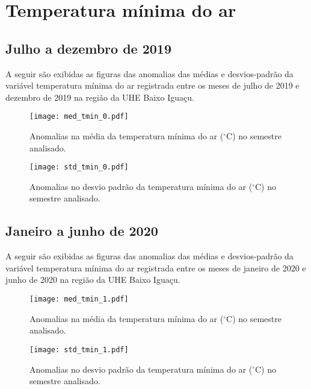 \documentclass[a4paper,12pt]{article}
\begin{document}
        \newpage

        \section{Temperatura mínima do ar }
        \subsection{Julho a dezembro de 2019}
        \hspace{0.5cm} A seguir são exibidas as figuras das anomalias das médias e desvios-padrão da variável temperatura mínima do ar
        registrada entre os meses de julho de 2019 e dezembro de 2019 na região da UHE Baixo Iguaçu.

        \begin{figure}[!htb]
        \centering
        \texttt{[image: med\_tmin\_0.pdf]}
        \caption{Anomalias na média da temperatura mínima do ar ($^\circ$C) no semestre analisado.}
        \label{fig:figmed_tmin_0}
        \end{figure}

        \begin{figure}[!htb]
        \centering
        \texttt{[image: std\_tmin\_0.pdf]}
        \caption{Anomalias no desvio padrão da temperatura mínima do ar ($^\circ$C) no semestre analisado.}
        \label{fig:figstd_tmin_0}
        \end{figure}

        \newpage
        \subsection{Janeiro a junho de 2020}
        \hspace{0.5cm} A seguir são exibidas as figuras das anomalias das médias e desvios-padrão da variável temperatura mínima do ar
        registrada entre os meses de janeiro de 2020 e junho de 2020 na região da UHE Baixo Iguaçu.

        \begin{figure}[!htb]
        \centering
        \texttt{[image: med\_tmin\_1.pdf]}
        \caption{Anomalias na média da temperatura mínima do ar ($^\circ$C) no semestre analisado.}
        \label{fig:figmed_tmin_1}
        \end{figure}

        \begin{figure}[!htb]
        \centering
        \texttt{[image: std\_tmin\_1.pdf]}
        \caption{Anomalias no desvio padrão da temperatura mínima do ar ($^\circ$C) no semestre analisado.}
        \label{fig:figstd_tmin_1}
        \end{figure}
\end{document}
